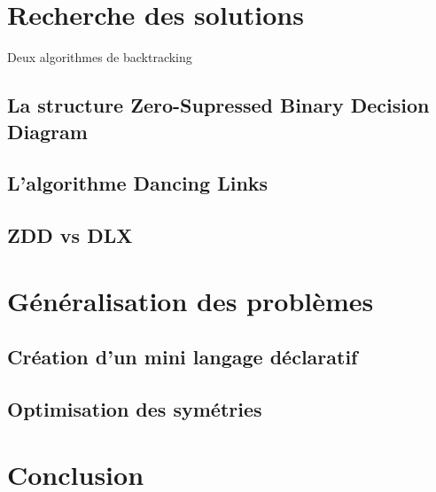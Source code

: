 \documentclass[a4paper]{article}
\begin{document}
\section{Recherche des solutions}

Deux algorithmes de backtracking

\subsection{La structure Zero-Supressed Binary Decision Diagram}
\subsection{L'algorithme Dancing Links}
\subsection{ZDD vs DLX}


\section{Généralisation des problèmes}
\subsection{Création d'un mini langage déclaratif}
\subsection{Optimisation des symétries}

\section{Conclusion}

	
	
\end{document}
